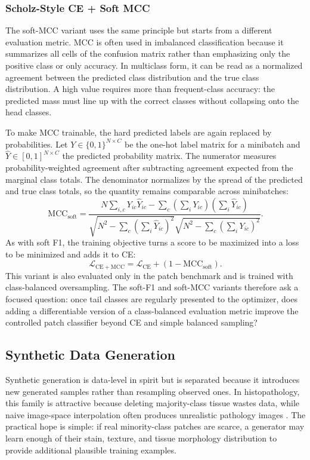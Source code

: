 \documentclass[11pt]{article}
\begin{document}
\subsubsection{Scholz-Style CE + Soft MCC}
The soft-MCC variant uses the same principle but starts from a different evaluation metric. MCC is often used in imbalanced classification because it summarizes all cells of the confusion matrix rather than emphasizing only the positive class or only accuracy. In multiclass form, it can be read as a normalized agreement between the predicted class distribution and the true class distribution. A high value requires more than frequent-class accuracy: the predicted mass must line up with the correct classes without collapsing onto the head classes.

To make MCC trainable, the hard predicted labels are again replaced by probabilities. Let $Y\in\{0,1\}^{N\times C}$ be the one-hot label matrix for a minibatch and $\widehat{Y}\in[0,1]^{N\times C}$ the predicted probability matrix. The numerator measures probability-weighted agreement after subtracting agreement expected from the marginal class totals. The denominator normalizes by the spread of the predicted and true class totals, so the quantity remains comparable across minibatches:
\begin{equation}
  \mathrm{MCC}_{\mathrm{soft}} =
  \frac{N\sum_{i,c}Y_{ic}\widehat{Y}_{ic}
        -\sum_c\left(\sum_i Y_{ic}\right)\left(\sum_i\widehat{Y}_{ic}\right)}
       {\sqrt{N^2-\sum_c\left(\sum_i\widehat{Y}_{ic}\right)^2}
        \sqrt{N^2-\sum_c\left(\sum_iY_{ic}\right)^2}}.
  \label{eq:soft-mcc}
\end{equation}
\noindent As with soft F1, the training objective turns a score to be maximized into a loss to be minimized and adds it to CE:
\begin{equation}
  \mathcal{L}_{\mathrm{CE+MCC}} =
  \mathcal{L}_{\mathrm{CE}} + \left(1-\mathrm{MCC}_{\mathrm{soft}}\right).
  \label{eq:ce-soft-mcc}
\end{equation}
\noindent This variant is also evaluated only in the patch benchmark and is trained with class-balanced oversampling. The soft-F1 and soft-MCC variants therefore ask a focused question: once tail classes are regularly presented to the optimizer, does adding a differentiable version of a class-balanced evaluation metric improve the controlled patch classifier beyond CE and simple balanced sampling?

\subsection{Synthetic Data Generation}
Synthetic generation is data-level in spirit but is separated because it introduces new generated samples rather than resampling observed ones. In histopathology, this family is attractive because deleting majority-class tissue wastes data, while naive image-space interpolation often produces unrealistic pathology images \citep{saini2023tacklingClass,ruizcasado2024enhancingHistopathological}. The practical hope is simple: if real minority-class patches are scarce, a generator may learn enough of their stain, texture, and tissue morphology distribution to provide additional plausible training examples.
\end{document}
